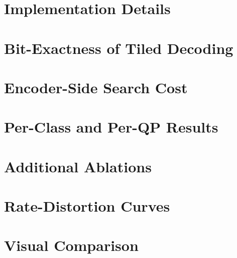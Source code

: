 \clearpage
\setcounter{page}{1}
\maketitlesupplementary

\section{Implementation Details}
\label{sec:supp_impl}

\section{Bit-Exactness of Tiled Decoding}
\label{sec:supp_bitexact}

\section{Encoder-Side Search Cost}
\label{sec:supp_encoder}

\section{Per-Class and Per-QP Results}
\label{sec:supp_perclass}

\section{Additional Ablations}
\label{sec:supp_ablations}

\section{Rate-Distortion Curves}
\label{sec:supp_rd}

\section{Visual Comparison}
\label{sec:supp_visual}

